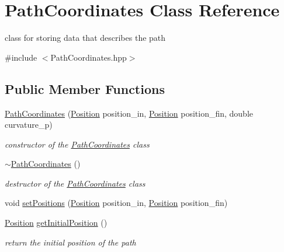 \hypertarget{class_path_coordinates}{}\section{Path\+Coordinates Class Reference}
\label{class_path_coordinates}


class for storing data that describes the path  




{\ttfamily \#include $<$Path\+Coordinates.\+hpp$>$}

\subsection*{Public Member Functions}
\begin{DoxyCompactItemize}
\item 
\mbox{\hyperlink{class_path_coordinates_a6540a40d24cb4e50577eda489b7fe1bb}{Path\+Coordinates}} (\mbox{\hyperlink{class_position}{Position}} position\+\_\+in, \mbox{\hyperlink{class_position}{Position}} position\+\_\+fin, double curvature\+\_\+p)
\begin{DoxyCompactList}\small\item\em constructor of the \mbox{\hyperlink{class_path_coordinates}{Path\+Coordinates}} class \end{DoxyCompactList}\item 
\mbox{\label{class_path_coordinates_a960c365c8307fb139e425a24d2eb8c66}} 
\mbox{\hyperlink{class_path_coordinates_a960c365c8307fb139e425a24d2eb8c66}{$\sim$\+Path\+Coordinates}} ()
\begin{DoxyCompactList}\small\item\em destructor of the \mbox{\hyperlink{class_path_coordinates}{Path\+Coordinates}} class \end{DoxyCompactList}\item 
void \mbox{\hyperlink{class_path_coordinates_a730ba85010cbd33da4e76fe0f05fb2b0}{set\+Positions}} (\mbox{\hyperlink{class_position}{Position}} position\+\_\+in, \mbox{\hyperlink{class_position}{Position}} position\+\_\+fin)
\item 
\mbox{\hyperlink{class_position}{Position}} \mbox{\hyperlink{class_path_coordinates_a10450bb899bec6d9f8be0a115c2c588b}{get\+Initial\+Position}} ()
\begin{DoxyCompactList}\small\item\em return the initial position of the path \end{DoxyCompactList}\item 

\end{DoxyCompactItemize}
